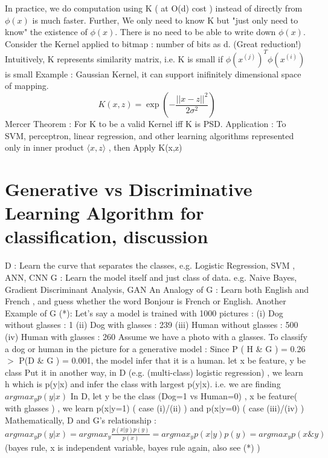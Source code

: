 \documentclass{article}
\begin{document}
In practice, we do computation using K ( at O(d) cost ) instead of directly from \(\phi(x)\) is much faster. Further, We only need to know K but "just only need to know" the existence of \(\phi(x)\). There is no need to be able to write down \(\phi(x)\). Consider the Kernel applied to bitmap : number of bits as d. (Great reduction!)
\newline  
Intuitively, K represents similarity matrix, i.e. K is small if \( \phi(x^{(j)})^T \phi(x^{(i)})\) is small
\newline
Example : Gaussian Kernel, it can support inifinitely dimensional space of mapping.
\[K(x, z) = \exp\left(-\frac{||x - z||^2}{2\sigma^2}\right)\]
\newline 
Mercer Theorem : For K to be a valid Kernel iff K is PSD.
\newline 
Application : To SVM, perceptron, linear regression, and other learning algorithms represented only in inner product \(\langle x,z\rangle\) , then Apply K(x,z)  

 
\section{Generative vs Discriminative Learning Algorithm for classification, discussion} 
D : Learn the curve that separates the classes, e.g. Logistic Regression, SVM , ANN, CNN \newline
G : Learn the model itself and just class of data. e.g. Naive Bayes, Gradient Discriminant Analysis, GAN\newline
An Analogy of G : Learn both English and French , and guess whether the word Bonjour is French or English. \newline
Another Example of G (*): \newline
Let's say a model is trained with 1000 pictures :\newline 
(i) Dog without glasses : 1 \newline
(ii) Dog with glasses : 239 \newline
(iii) Human without glasses : 500 \newline
(iv) Human with glasses : 260 \newline
Assume we have a photo with a glasses. To classify a dog or human in the picture for a generative model : Since P ( H \& G ) = 0.26 \(>\) P(D \& G ) = 0.001, the model infer that it is a human.\newline
let x be feature, y be class\newline
Put it in another way, in D  (e.g. (multi-class) logistic regression) , we learn h which is p(y\(|\)x) and infer the class with largest p(y\(|\)x). i.e. we are finding \(argmax_{y} p(y|x)\)\newline
In D, let y be the class (Dog=1 vs Human=0) , x be feature( with glasses ) , we learn p(x\(|\)y=1) ( case (i)/(ii) )  and p(x\(|\)y=0) ( case (iii)/(iv) )\newline 
Mathematically, D and G's relationship :  \(argmax_{y} p(y|x) = argmax_{y} \frac{p(x|y)p(y)}{p(x)} = argmax_{y} p(x|y)p(y) = argmax_{y} p(x \& y) \)\newline
(bayes rule, x is independent variable, bayes rule again, also see (*) )\newline
\end{document}
